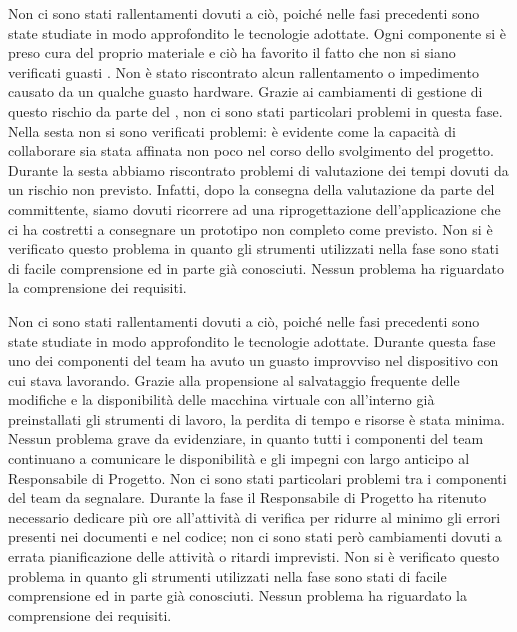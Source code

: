 		Non ci sono stati rallentamenti dovuti a ciò, poiché nelle fasi precedenti sono state studiate in modo approfondito le tecnologie adottate.
		Ogni componente si è preso cura del proprio materiale e ciò ha favorito il fatto che non si siano verificati guasti . Non è stato riscontrato alcun rallentamento o impedimento causato da un qualche guasto hardware.
		Grazie ai cambiamenti di gestione di questo rischio da parte del , non ci sono stati particolari problemi in questa fase.
		Nella sesta  non si sono verificati problemi: è evidente come la capacità di collaborare sia stata affinata non poco nel corso dello svolgimento del progetto.
		Durante la sesta  abbiamo riscontrato problemi di valutazione dei tempi dovuti da un rischio non previsto. Infatti, dopo la consegna della valutazione da parte del committente, siamo dovuti ricorrere ad una riprogettazione dell'applicazione  che ci ha costretti a consegnare un prototipo non completo come previsto.
		Non si è verificato questo problema in quanto gli strumenti utilizzati nella fase sono stati di facile comprensione ed in parte già conosciuti.
		Nessun problema ha riguardato la comprensione dei requisiti.

		Non ci sono stati rallentamenti dovuti a ciò, poiché nelle fasi precedenti sono state studiate in modo approfondito le tecnologie adottate.
		Durante questa fase uno dei componenti del team ha avuto un guasto  improvviso nel dispositivo con cui stava lavorando. Grazie alla propensione al salvataggio frequente delle modifiche e la disponibilità delle macchina virtuale con all'interno già preinstallati gli strumenti di lavoro, la perdita di tempo e risorse è stata minima.
		Nessun problema grave da evidenziare, in quanto tutti i componenti del team continuano a comunicare le disponibilità e gli impegni con largo anticipo al Responsabile di Progetto.
		Non ci sono stati particolari problemi tra i componenti del team da segnalare.
		Durante la fase il Responsabile di Progetto ha ritenuto necessario dedicare più ore all'attività di verifica per ridurre al minimo gli errori presenti nei documenti e nel codice; non ci sono stati però cambiamenti dovuti a errata pianificazione delle attività o ritardi imprevisti.
		Non si è verificato questo problema in quanto gli strumenti utilizzati nella fase sono stati di facile comprensione ed in parte già conosciuti.
		Nessun problema ha riguardato la comprensione dei requisiti.
